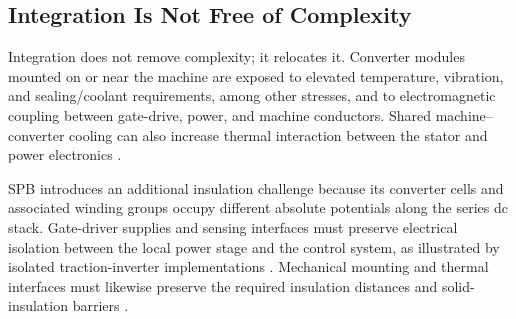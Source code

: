 \subsection{Integration Is Not Free of Complexity}

Integration does not remove complexity; it relocates it. Converter
modules mounted on or near the machine are exposed to elevated
temperature, vibration, and sealing/coolant requirements, among other
stresses, and to electromagnetic coupling between gate-drive, power,
and machine conductors. Shared machine--converter cooling can
also increase thermal interaction between the stator and power
electronics \cite{Mohamed2021Electrothermal}.

SPB introduces an additional insulation challenge because its
converter cells and associated winding groups occupy different
absolute potentials along the series dc stack. Gate-driver supplies and sensing interfaces must preserve electrical
isolation between the local power stage and the control system, as
illustrated by isolated traction-inverter implementations
\cite{TI2019TractionIsolation}. Mechanical mounting and thermal
interfaces must likewise preserve the required insulation distances
and solid-insulation barriers \cite{IEC60664Part1}.

